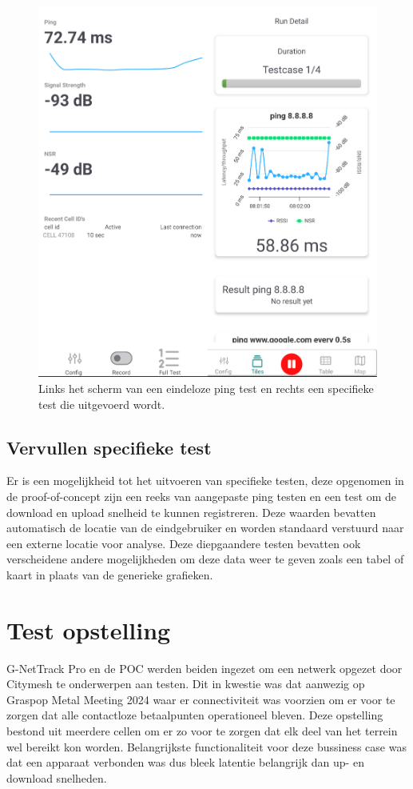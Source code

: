 \begin{figure}[!htb]
    \includegraphics[width=1\linewidth]{graphics/continuousspecificmerge}
    \caption[Links het scherm van een eindeloze ping test en rechts een specifieke test die uitgevoerd wordt.]{Links het scherm van een eindeloze ping test en rechts een specifieke test die uitgevoerd wordt.}
    \label{fig:continuousandspecific}
\end{figure}

\subsection{Vervullen specifieke test}

Er is een mogelijkheid tot het uitvoeren van specifieke testen, deze opgenomen in de proof-of-concept zijn een reeks van aangepaste ping testen en een test om de download en upload snelheid te kunnen registreren. Deze waarden bevatten automatisch de locatie van de eindgebruiker en worden standaard verstuurd naar een externe locatie voor analyse. Deze diepgaandere testen bevatten ook verscheidene andere mogelijkheden om deze data weer te geven zoals een tabel of kaart in plaats van de generieke grafieken.

\section{Test opstelling}

G-NetTrack Pro en de POC werden beiden ingezet om een netwerk opgezet door Citymesh te onderwerpen aan testen. Dit in kwestie was dat aanwezig op Graspop Metal Meeting 2024 waar er connectiviteit was voorzien om er voor te zorgen dat alle contactloze betaalpunten operationeel bleven. Deze opstelling bestond uit meerdere cellen om er zo voor te zorgen dat elk deel van het terrein wel bereikt kon worden. Belangrijkste functionaliteit voor deze bussiness case was dat een apparaat verbonden was dus bleek latentie belangrijk dan up- en download snelheden. 